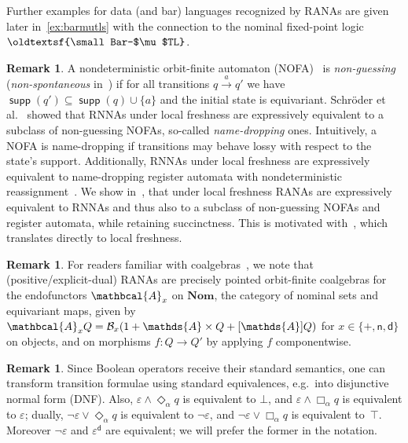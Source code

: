 \documentclass[10pt,a4paper]{amsart}
\theoremstyle{definition}
\newtheorem{rem}[theo]{Remark}
\renewcommand{\textsf}[1]{{\oldtextsf{\small#1}}}
\newcommand{\seq}{\subseteq}
\newcommand{\xra}[1]{\xrightarrow{#1}}
\newcommand{\muBar}{\mbox{\textsf{Bar-$\mu$TL}}\xspace}
\newcommand{\At}{\mathds{A}}
\newcommand{\allbool}{\mathcal{B}}
\newcommand{\dual}[1]{{#1}^\mathsf{d}}
\newcommand{\Nom}{\mathbf{Nom}}
\DeclareMathOperator{\supp}{\mathsf{supp}}
\newcommand{\names}{\At}
\newcommand{\Abstr}[2][\names]{[#1]#2}
\newcommand{\set}[1]{\{#1\}}
\newcommand{\RANAFunc}{\ensuremath{\mathbcal{A}}}
\begin{document}
Further examples for data (and bar) languages recognized by RANAs are given later in~\cref{ex:barmutls}
with the connection to the nominal fixed-point logic $\muBar$.

\begin{rem}
  A nondeterministic orbit-finite automaton (NOFA)~\cite{BojanczykEA14} is
  \emph{non-guessing} (\emph{non-spontaneous} in~\cite{skmw17}) if
  for all transitions $q \xra{a} q'$ we have $\supp(q') \seq \supp(q) \cup \set{a}$
  and the initial state is equivariant. Schröder et al.~\cite{skmw17}
  showed that RNNAs under local freshness are expressively equivalent
  to a subclass of non-guessing NOFAs, so-called \emph{name-dropping} ones.
  Intuitively, a NOFA is name-dropping if transitions may behave lossy
  with respect to the state's support. Additionally, RNNAs under local freshness
  are expressively equivalent to name-dropping register automata with nondeterministic
  reassignment~\cite{KaminskiZeitlin10}.
  We show in~, that under local freshness RANAs are
  expressively equivalent to RNNAs and thus also to
  a subclass of non-guessing NOFAs and register automata, while retaining succinctness.
  This is motivated with~, which translates directly to
  local freshness.
\end{rem}

\begin{rem}\label{rem:rana:coalg}
  For readers familiar with coalgebras~\cite{Rutten00}, we note that (positive/explicit-dual) RANAs are precisely
  pointed orbit-finite coalgebras for the endofunctors $\RANAFunc_x$ 
  on $\Nom$, the category of nominal sets and equivariant maps, given by $\RANAFunc_x Q =
  \allbool_x(1 + \names \times Q + \Abstr{Q})$ for $x \in \set{+,\mathsf{n},\mathsf{d}}$
  on objects, and on morphisms $f\colon Q\to Q'$ by applying $f$ componentwise.
\end{rem}

\begin{rem}\label{rem:ranadefn}
  Since Boolean operators receive their standard
  semantics, one can transform transition formulae using standard
  equivalences, e.g.~into disjunctive normal form (DNF). Also,
  $\varepsilon \wedge \Diamond_\alpha q$ is equivalent to $\bot$, and
  $\varepsilon \wedge \Box_\alpha q$ is equivalent to $\varepsilon$;
  dually, $\neg\varepsilon\vee\Diamond_\alpha q$ is equivalent to
  $\neg\varepsilon$, and $\neg\varepsilon\vee\Box_\alpha q$ is
  equivalent to~$\top$. Moreover $\neg\varepsilon$ and
  $\dual{\varepsilon}$ are equivalent; we will prefer the former in
  the notation.
\end{rem}
\end{document}
